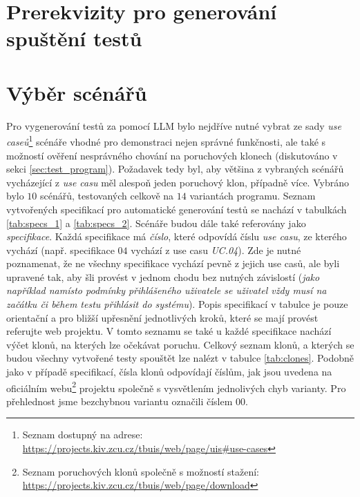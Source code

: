 \documentclass[czech, ma, kiv, he, iso690alph, pdf, viewonly]{fasthesis}
\begin{document}
    \section{Prerekvizity pro generování spuštění testů}

    \section{Výběr scénářů} \label{sec:scenarios}

    Pro vygenerování testů za pomocí LLM bylo nejdříve nutné vybrat ze sady \textit{use caseů}\footnote{Seznam dostupný na adrese: \url{https://projects.kiv.zcu.cz/tbuis/web/page/uis#use-cases}} scénáře vhodné pro demonstraci nejen správné funkčnosti, ale také s možností ověření nesprávného chování na poruchových klonech (diskutováno v sekci \ref{sec:test_program}). Požadavek tedy byl, aby většina z vybraných scénářů vycházející z \textit{use casu} měl alespoň jeden poruchový klon, případně více. Vybráno bylo \(10\) scénářů, testovaných celkově na \(14\) variantách programu. Seznam vytvořených specifikací pro automatické generování testů se nachází v tabulkách \ref{tab:specs_1} a \ref{tab:specs_2}. Scénáře budou dále také referovány jako \textit{specifikace}. Každá specifikace má \textit{číslo}, které odpovídá číslu \textit{use casu}, ze kterého vychází (např. specifikace \(04\) vychází z use casu \textit{UC.04}). Zde je nutné poznamenat, že ne všechny specifikace vychází pevně z jejich use casů, ale byli upravené tak, aby šli provést v jednom chodu bez nutných závislostí (\textit{jako například namísto podmínky přihlášeného uživatele se uživatel vždy musí na začátku či během testu přihlásit do systému}). Popis specifikací v tabulce je pouze orientační a pro bližší upřesnění jednotlivých kroků, které se mají provést referujte web projektu. V tomto seznamu se také u každé specifikace nachází výčet klonů, na kterých lze očekávat poruchu. Celkový seznam klonů, a kterých se budou všechny vytvořené testy spouštět lze nalézt v tabulce \ref{tab:clones}. Podobně jako v případě specifikací, čísla klonů odpovídají číslům, jak jsou uvedena na oficiálním webu\footnote{Seznam poruchových klonů společně s možností stažení: \url{https://projects.kiv.zcu.cz/tbuis/web/page/download}} projektu společně s vysvětlením jednolivých chyb varianty. Pro přehlednost jsme bezchybnou variantu označili číslem \(00\).
\end{document}
